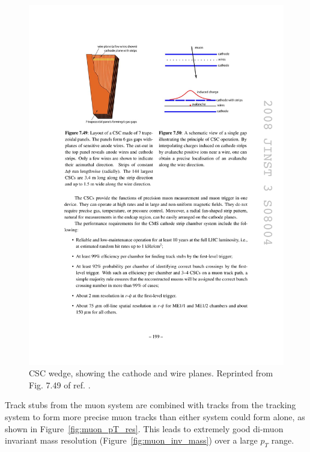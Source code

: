 \documentclass[dissertation.tex]{subfiles}
\begin{document}
\begin{figure}
	\centering
	\includegraphics[scale=1.0]{muons_CSC_wedge}
	\caption{CSC wedge, showing the cathode and wire planes.  Reprinted from Fig. 7.49 of ref. \cite{1748-0221-3-08-S08004}.}
	\label{fig:muons_CSC_wedge}
\end{figure}

Track stubs from the muon system are combined with tracks from the tracking system to form more precise muon tracks than either system could form alone, as shown in Figure~\ref{fig:muon_pT_res}.  This leads to extremely good di-muon invariant mass resolution (Figure~\ref{fig:muon_inv_mass}) over a large $p_{T}$ range.
\end{document}
